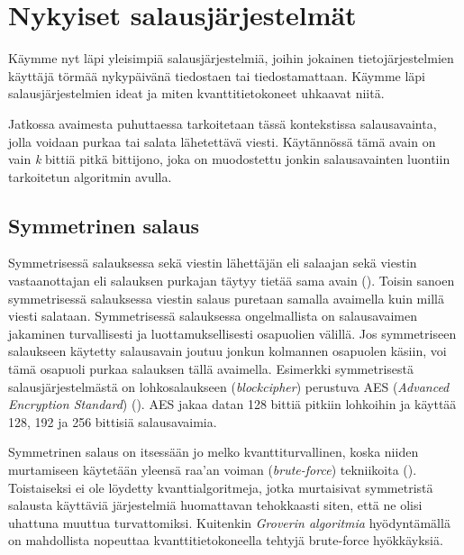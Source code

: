 \chapter{Nykyiset salausjärjestelmät\label{methods}}

Käymme nyt läpi yleisimpiä salausjärjestelmiä, joihin jokainen tietojärjestelmien käyttäjä törmää nykypäivänä tiedostaen tai tiedostamattaan. Käymme läpi salausjärjestelmien ideat ja miten kvanttitietokoneet uhkaavat niitä.

Jatkossa avaimesta puhuttaessa tarkoitetaan tässä kontekstissa salausavainta, jolla voidaan purkaa tai salata lähetettävä viesti. Käytännössä tämä avain on vain \emph{k} bittiä pitkä bittijono, joka on muodostettu jonkin salausavainten luontiin tarkoitetun algoritmin avulla.

\section{Symmetrinen salaus}
 Symmetrisessä salauksessa sekä viestin lähettäjän eli salaajan sekä viestin vastaanottajan eli salauksen purkajan täytyy tietää sama avain (\cite{bellare2005introduction}). Toisin sanoen symmetrisessä salauksessa viestin salaus puretaan samalla avaimella kuin millä viesti salataan.  Symmetrisessä salauksessa ongelmallista on salausavaimen jakaminen turvallisesti ja luottamuksellisesti osapuolien välillä. Jos symmetriseen salaukseen käytetty salausavain joutuu jonkun kolmannen osapuolen käsiin, voi tämä osapuoli purkaa salauksen tällä avaimella. Esimerkki symmetrisestä salausjärjestelmästä on lohkosalaukseen (\emph{blockcipher}) perustuva AES (\emph{Advanced Encryption Standard}) (\cite{117146}). AES jakaa datan 128 bittiä pitkiin lohkoihin ja käyttää 128, 192 ja 256 bittisiä salausavaimia.
 
 Symmetrinen salaus on itsessään jo melko kvanttiturvallinen, koska niiden murtamiseen käytetään yleensä raa'an voiman (\emph{brute-force}) tekniikoita (\cite{mavroeidis2018impact}). Toistaiseksi ei ole löydetty kvanttialgoritmeja, jotka murtaisivat symmetristä salausta käyttäviä järjestelmiä huomattavan tehokkaasti siten, että ne olisi uhattuna muuttua turvattomiksi. Kuitenkin \emph{Groverin algoritmia} hyödyntämällä on mahdollista nopeuttaa kvanttitietokoneella tehtyjä brute-force hyökkäyksiä.
 
